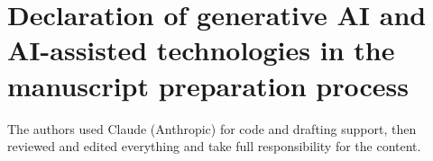 \section{Declaration of generative AI and AI-assisted technologies in the manuscript preparation process}
The authors used Claude (Anthropic) for code and drafting support, then reviewed and edited everything and take full responsibility for the content.


